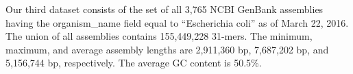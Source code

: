 







Our third dataset consists of the set of all 3,765  NCBI GenBank assemblies having the organism\_name field equal to ``Escherichia coli'' as of March 22, 2016.  The union of all assemblies contains 155,449,228 31-mers.  The minimum, maximum, and average assembly lengths are 2,911,360 bp, 7,687,202 bp, and 5,156,744 bp, respectively.  The average GC content is 50.5\%. 


